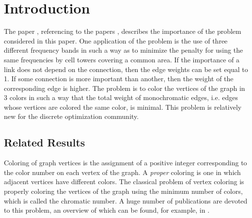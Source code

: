 \documentclass[runningheads]{llncs}
\begin{document}
\section{Introduction}
The paper \cite{Erzin:24}, referencing to the papers \cite{Acedo:15,Bandh:09,Chandra:21,Gui:18}, describes the importance of the problem considered in this paper. One application of the problem is the use of three different frequency bands in such a way as to minimize the penalty for using the same frequencies by cell towers covering a common area. If the importance of a link does not depend on the connection, then the edge weights can be set equal to 1. If some connection is more important than another, then the weight of the corresponding edge is higher. The problem is to color the vertices of the graph in 3 colors in such a way that the total weight of monochromatic edges, i.e. edges whose vertices are colored the same color, is minimal. This problem is relatively new for the discrete optimization community.

\subsection{Related Results}
Coloring of graph vertices is the assignment of a positive integer corresponding to the color number on each vertex of the graph. A \emph{proper} coloring is one in which adjacent vertices have different colors. The classical problem of vertex coloring is properly coloring the vertices of the graph using the minimum number of colors, which is called the chromatic number. A huge number of publications are devoted to this problem, an overview of which can be found, for example, in \cite{Borodin:13,Husfeldt:15,Kostochka:13,Thakare:24}.
\end{document}

